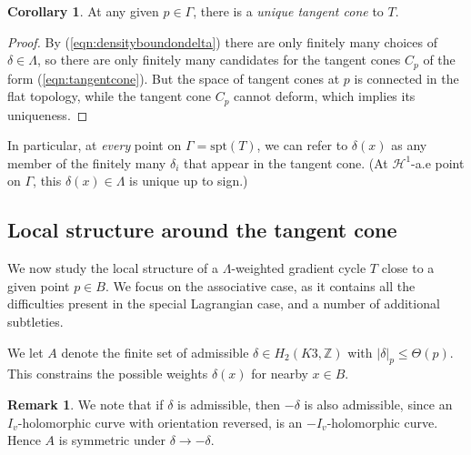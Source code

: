 \documentclass{article}
\theoremstyle{definition}
\newtheorem{cor}[thm]{Corollary}
\newtheorem{rmk}{Remark}
\newcommand{\Z}{\mathbb{Z}}
\begin{document}
					
		
			

					

				
				
					

					
\begin{cor}
At any given $p\in \Gamma$, there is a \emph{unique tangent cone} to $T$.
\end{cor}


\begin{proof}
By (\ref{eqn:densityboundondelta}) there are only finitely many choices of $\delta\in \Lambda$, so there are only finitely many candidates for the tangent cones $C_p$ of the form (\ref{eqn:tangentcone}). But the space of tangent cones at $p$ is connected in the flat topology, while the tangent cone $C_p$ cannot deform, which implies its uniqueness.
\end{proof}

		
		
		

		

		
		
		
	In particular, at \emph{every} point on $\Gamma= \text{spt}(T)$,  we can refer to $\delta(x) $ as any member of the finitely many $\delta_i$ that appear in the tangent cone.  (At $\mathcal{H}^1$-a.e point on $\Gamma$, this $\delta(x)\in \Lambda$ is unique up to sign.) 
		
		
		
		\subsection{Local structure around the tangent cone}
		
			
			
			
			
			
			
			
			
			We now study the local structure of a $\Lambda$-weighted gradient cycle $T$ close to a given point $p\in B$. We focus on the associative case, as it contains all the difficulties present in the special Lagrangian case, and a number of additional subtleties. 
			
			
			
			
			We let $A$ denote the finite set of admissible $\delta\in H_2(K3, \Z)$ with $|\delta|_p \leq \Theta(p)$. This constrains the possible weights $\delta(x)$ for nearby $x\in B$.
			
				\begin{rmk}\label{rmk:reversedelta}
				We note that if $\delta$ is admissible, then $-\delta$ is also admissible, since an $I_v$-holomorphic curve with orientation reversed, is an $-I_v$-holomorphic curve. 	
				Hence $A$ is symmetric under $\delta\to -\delta$.
			\end{rmk}
			
\end{document}
